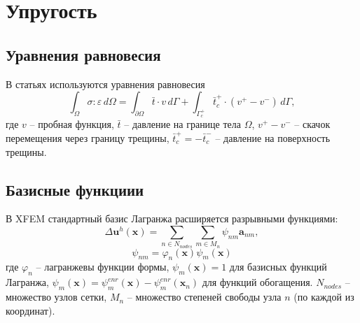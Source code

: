 \newpage
\section{Упругость}
\subsection{Уравнения равновесия}
В статьях \cite{Gupta2014,Gupta2015,Gupta2017,Duarte2019,Duarte2020_validation} используются уравнения равновесия
\begin{equation}
\int_{\Omega} \sigma:\varepsilon\,d\Omega=
\int_{\partial\Omega} \bar{t}\cdot v\,d\Gamma+
\int_{\Gamma_c^+} \bar{t}_c^+ \cdot \left(v^+-v^-\right)\,d\Gamma,
\label{F:F_XFEM_Governing}
\end{equation}
где $v$ -- пробная функция, $\bar{t}$ -- давление на границе тела $\Omega$, $v^+-v^-$ -- скачок перемещения через границу трещины, $\bar{t}_c^+=-\bar{t}_c^-$ -- давление на поверхность трещины.
\subsection{Базисные функциии}
В XFEM стандартный базис Лагранжа расширяется разрывными функциями:
\begin{equation}
\Delta \mathbf{u}^h\left(\mathbf{x}\right)=
\sum_{n\in N_{nodes}}\sum_{m\in M_{n}}\psi_{nm} \mathbf{a}_{nm},
\label{F:F_XFEM_appr}
\end{equation}
\begin{equation}
\psi_{nm}=\varphi_n\left(\mathbf{x}\right)\psi_m\left(\mathbf{x}\right)
\label{F:F_XFEM_appr2}
\end{equation}
где $\varphi_{n}$ -- лагранжевы функции формы, $\psi_m\left(\mathbf{x}\right) = 1$ для базисных функций Лагранжа, $\psi_m\left(\mathbf{x}\right)=\psi_m^{enr}\left(\mathbf{x}\right)-\psi_m^{enr}\left(\mathbf{x}_n\right)$ для функций обогащения. $N_{nodes}$ -- множество узлов сетки, $M_{n}$ -- множество степеней свободы узла $n$ (по каждой из координат).

